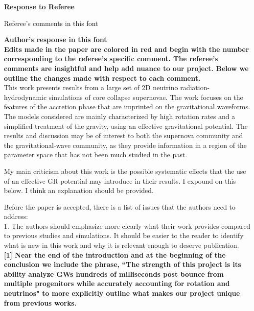 \documentclass[11pt]{article}
\begin{document}
\setcounter{page}{1}  \renewcommand{\thepage}
           {\arabic{page}}%

\begin{center}
{\bf Response to Referee} \vspace{-0.2in}
\end{center}

Referee's comments in this font

\textbf{Author's response in this font}\\

\textbf{Edits made in the paper are colored in red and begin with the number corresponding to the referee's specific comment.  The referee's comments are insightful and help add nuance to our project.  Below we outline the changes made with respect to each comment.}\\

This work presents results from a large set of 2D neutrino radiation-hydrodynamic simulations of core collapse supernovae. The work focuses on the features of the accretion phase that are imprinted on the gravitational waveforms. The models considered are mainly characterized by high rotation rates and a simplified treatment of the gravity, using an effective gravitational potential. The results and discussion may be of interest to both the supernova community and the gravitational-wave community, as they provide information in a region of the parameter space that has not been much studied in the past.

My main criticism about this work is the possible systematic effects that the 
use of an effective GR potential may introduce in their results. I expound on
this below. I think an explanation should be provided.

Before the paper is accepted, there is a list of issues that the authors need to 
address:\\

1. The authors should emphasize more clearly what their work provides compared to previous studies and simulations. It should be easier to the reader to identify what is new in this work and why it is relevant enough to deserve publication.\\

\textbf{[1] Near the end of the introduction and at the beginning of the conclusion we include the phrase, ``The strength of this project is its ability analyze GWs hundreds of milliseconds post bounce from multiple progenitors while accurately accounting for rotation and neutrinos" to more explicitly outline what makes our project unique from previous works.}\\
\end{document}
